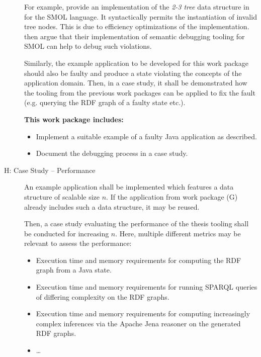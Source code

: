 \documentclass[
	english,
	accentcolor=9c,%
  marginpar=0cm %
	]{tudapub}
\begin{document}
\begin{description}
    For example, \citeauthor{kamburjan2021programming} provide an implementation
    of the \emph{2-3 tree} data structure in \cite{kamburjan2021programming}
    for the SMOL language. It syntactically permits the instantiation of invalid
    tree nodes. This is due to efficiency optimizations
    of the implementation.
     then argue that their implementation
    of semantic debugging tooling for SMOL can help to debug such violations. 

    Similarly, the example application to be developed for this work package
    should also be faulty and produce a state violating the concepts of the
    application domain.
    Then, in a case study, it shall be demonstrated how the tooling from the
    previous work packages can be applied to fix the fault
    (e.g. querying the RDF graph of a faulty state etc.).

    \textbf{This work package includes:}
    \begin{itemize}
      \item Implement a suitable example of a faulty Java application as
        described.
      \item Document the debugging process in a case study.
    \end{itemize}
  \item[H: Case Study -- Performance]
    An example application shall be implemented which features a data structure 
    of scalable size $n$.
    If the application from work package (G) already includes such a data
    structure, it may be reused.

    Then, a case study evaluating the performance of the thesis tooling shall be
    conducted for increasing $n$.
    Here, multiple different metrics may be relevant to assess the performance:
    \begin{itemize}
        \item Execution time and memory requirements for computing the RDF graph
          from a Java state.
        \item Execution time and memory requirements for running SPARQL queries
          of differing complexity on the RDF graphs.
        \item Execution time and memory requirements for computing increasingly
          complex inferences via the Apache Jena reasoner on the generated RDF
          graphs.
        \item \ldots
    \end{itemize}


\end{description}
\end{document}
